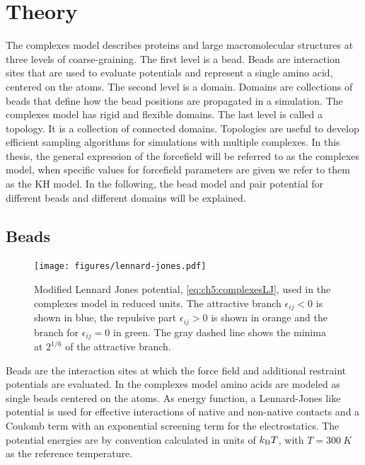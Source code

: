\documentclass[12pt, twoside]{report}
\begin{document}
\chapter{Theory}

The complexes model describes proteins and large macromolecular structures at
three levels of coarse-graining. The first level is a bead. Beads are
interaction sites that are used to evaluate potentials and represent a single
amino acid, centered on the \calpha atoms. The second level is a domain. Domains
are collections of beads that define how the bead positions are propagated in a
simulation. The complexes model has rigid and flexible domains. The last level
is called a topology. It is a collection of connected domains. Topologies are
useful to develop efficient sampling algorithms for simulations with multiple
complexes. In this thesis, the general expression of the forcefield will be
referred to as the complexes model, when specific values for forcefield
parameters are given we refer to them as the \gls{KH} model. In the following,
the bead model and pair potential for different beads and different domains will
be explained.

\section{Beads}
\begin{figure}[!ht] \centering
\texttt{[image: figures/lennard-jones.pdf]}
\caption[Modified Lennard Jones potential used in \complexes.]{Modified Lennard
Jones potential, \cref{eq:ch5:complexesLJ}, used in the complexes model in
reduced units. The attractive branch \(\epsilon_{ij}<0\) is shown in blue, the
repulsive part \(\epsilon_{ij}>0\) is shown in orange and the branch for
\(\epsilon_{ij}=0\) in green. The gray dashed line shows the minima at
\(2^{1/6}\) of the attractive branch.}
\label{fig:lennard-jones}
\end{figure} Beads are the interaction sites at which the force field and
additional restraint potentials are evaluated. In the complexes model
\cite{Kim2008} amino acids are modeled as single beads centered on the \calpha
atoms. As energy function, a Lennard-Jones like potential is used for effective
interactions of native and non-native contacts and a Coulomb term with an
exponential screening term for the electrostatics. The potential energies are by
convention calculated in units of \(k_{\mathrm{B}}T\), with \(T=\SI{300}{K}\) as the
reference temperature.
\end{document}
